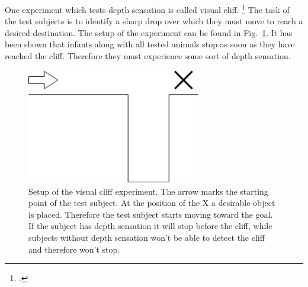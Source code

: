 One experiment which tests depth sensation is called visual cliff. \footcite{Gibson_The_visual_cliff} The task of the test subjects is to identify a sharp drop over which they must move to reach a desired destination. The setup of the experiment can be found in Fig.~\ref{pic:study_of_literature_depth_perception_depth_sensation_visual_cliff}. It has been shown that infants along with all tested animals stop as soon as they have reached the cliff. Therefore they must experience some sort of depth sensation.

\begin{figure}[h!]
	\centering
	\includegraphics[width=3in]{img/study_of_literature_depth_perception_depth_sensation_visual_cliff.png}
	\caption{Setup of the visual cliff experiment. The arrow marks the starting point of the test subject. At the position of the X a desirable object is placed. Therefore the test subject starts moving toward the goal. If the subject has depth sensation it will stop before the cliff, while subjects without depth sensation won't be able to detect the cliff and therefore won't stop.}
	\label{pic:study_of_literature_depth_perception_depth_sensation_visual_cliff}
\end{figure}

\filbreak